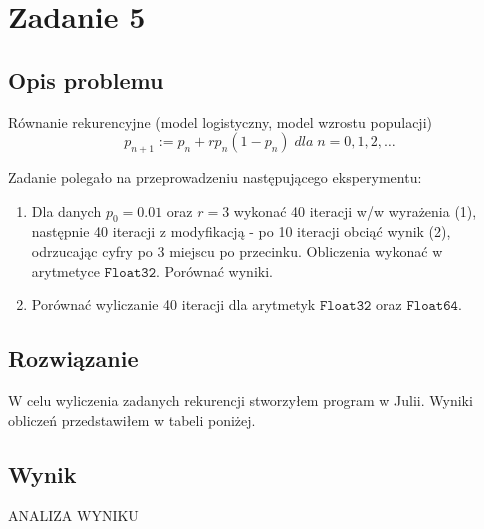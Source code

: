 \section{Zadanie 5}
\subsection{Opis problemu}
Równanie rekurencyjne (model logistyczny, model wzrostu populacji)
$$ p_{n+1} := p_n + rp_n(1 - p_n)\; dla\; n = 0, 1, 2,\ldots$$

Zadanie polegało na przeprowadzeniu następującego eksperymentu:
\begin{enumerate}[label=(\alph*)]
  \item Dla danych $ p_0 = 0.01 $ oraz $ r = 3 $ wykonać 40 iteracji w/w wyrażenia (1), następnie 40 iteracji z modyfikacją - po 10 iteracji obciąć wynik (2), odrzucając cyfry po 3 miejscu po przecinku. Obliczenia wykonać w arytmetyce $ \mathtt{Float32} $. Porównać wyniki.
  \item Porównać wyliczanie 40 iteracji dla arytmetyk $ \mathtt{Float32} $ oraz $ \mathtt{Float64} $.
\end{enumerate}
\subsection{Rozwiązanie}
W celu wyliczenia zadanych rekurencji stworzyłem program w Julii. Wyniki obliczeń przedstawiłem w tabeli poniżej.
\subsection{Wynik}
\begin{center}
    
\end{center}

ANALIZA WYNIKU